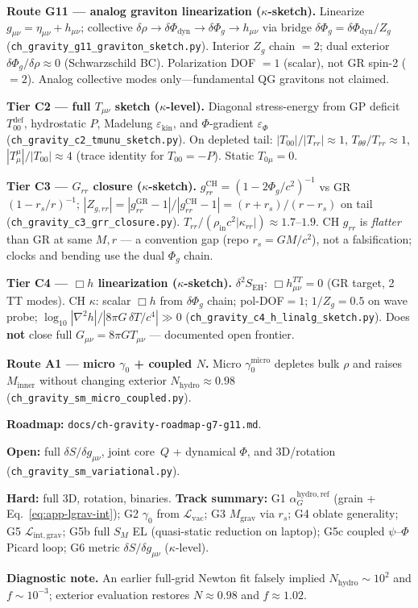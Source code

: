 \documentclass[11pt,a4paper]{article}
\begin{document}
\textbf{Route G11 --- analog graviton linearization ($\kappa$-sketch).}
Linearize $g_{\mu\nu}=\eta_{\mu\nu}+h_{\mu\nu}$; collective $\delta\rho\to\delta\Phi_{\mathrm{dyn}}\to\delta\Phi_g\to h_{\mu\nu}$ via bridge $\delta\Phi_g=\delta\Phi_{\mathrm{dyn}}/Z_g$ (\texttt{ch\_gravity\_g11\_graviton\_sketch.py}). Interior $Z_g$ chain $=2$; dual exterior $\delta\Phi_g/\delta\rho\approx 0$ (Schwarzschild BC). Polarization DOF $=1$ (scalar), not GR spin-2 ($=2$). Analog collective modes only---fundamental QG gravitons not claimed.

\textbf{Tier C2 --- full $T_{\mu\nu}$ sketch ($\kappa$-level).}
Diagonal stress-energy from GP deficit $T_{00}^{\mathrm{def}}$, hydrostatic $P$, Madelung $\varepsilon_{\mathrm{kin}}$, and $\Phi$-gradient $\varepsilon_\Phi$ (\texttt{ch\_gravity\_c2\_tmunu\_sketch.py}). On depleted tail: $|T_{00}|/|T_{rr}|\approx 1$, $T_{\theta\theta}/T_{rr}\approx 1$, $|T^\mu_\mu|/|T_{00}|\approx 4$ (trace identity for $T_{00}=-P$). Static $T_{0\mu}=0$.

\textbf{Tier C3 --- $G_{rr}$ closure ($\kappa$-sketch).}
$g_{rr}^{\mathrm{CH}}=(1-2\Phi_g/c^2)^{-1}$ vs GR $(1-r_s/r)^{-1}$; $|Z_{g,rr}|=|g_{rr}^{\mathrm{GR}}-1|/|g_{rr}^{\mathrm{CH}}-1|=(r+r_s)/(r-r_s)$ on tail (\texttt{ch\_gravity\_c3\_grr\_closure.py}). $T_{rr}/(\rho_{\mathrm{in}} c^2|\kappa_{rr}|)\approx 1.7$--$1.9$. CH $g_{rr}$ is \emph{flatter} than GR at same $M,r$ --- a convention gap (repo $r_s=GM/c^2$), not a falsification; clocks and bending use the dual $\Phi_g$ chain.

\textbf{Tier C4 --- $\Box h$ linearization ($\kappa$-sketch).}
$\delta^2 S_{\mathrm{EH}}$: $\Box h_{\mu\nu}^{TT}=0$ (GR target, 2 TT modes). CH $\kappa$: scalar $\Box h$ from $\delta\Phi_g$ chain; pol-DOF$=1$; $1/Z_g=0.5$ on wave probe; $\log_{10}|\nabla^2 h|/|8\pi G\,\delta T/c^4|\gg 0$ (\texttt{ch\_gravity\_c4\_h\_linalg\_sketch.py}). Does \textbf{not} close full $G_{\mu\nu}=8\pi G T_{\mu\nu}$ --- documented open frontier.

\textbf{Route A1 --- micro $\gamma_0$ + coupled $N$.}
Micro $\gamma_0^{\mathrm{micro}}$ depletes bulk $\rho$ and raises $M_{\mathrm{inner}}$ without changing exterior $N_{\mathrm{hydro}}\approx 0.98$ (\texttt{ch\_gravity\_sm\_micro\_coupled.py}).

\textbf{Roadmap:} \texttt{docs/ch-gravity-roadmap-g7-g11.md}.

\textbf{Open:} full $\delta S/\delta g_{\mu\nu}$, joint core~$Q$ + dynamical $\Phi$, and 3D/rotation (\texttt{ch\_gravity\_sm\_variational.py}).

\textbf{Hard:} full 3D, rotation, binaries.
\textbf{Track summary:} G1 $\alpha_G^{\mathrm{hydro,ref}}$ (grain + Eq.~\ref{eq:app-lgrav-int}); G2 $\gamma_0$ from $\mathcal{L}_{\mathrm{vac}}$; G3 $M_{\mathrm{grav}}$ via $r_s$; G4 oblate generality; G5 $\mathcal{L}_{\mathrm{int,grav}}$; G5b full $S_M$ EL (quasi-static reduction on laptop); G5c coupled $\psi$--$\Phi$ Picard loop; G6 metric $\delta S/\delta g_{\mu\nu}$ ($\kappa$-level).

\textbf{Diagnostic note.}
An earlier full-grid Newton fit falsely implied $N_{\mathrm{hydro}} \sim 10^2$ and $f \sim 10^{-3}$; exterior evaluation restores $N \approx 0.98$ and $f \approx 1.02$.


\printbibliography
\end{document}
